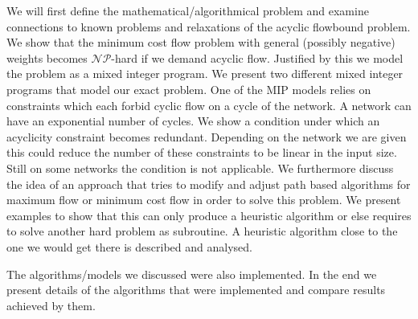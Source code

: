 We will first define the mathematical/algorithmical problem and examine connections to known problems 
and relaxations of the acyclic flowbound problem. We show that the minimum cost flow problem with general (possibly 
negative) weights becomes $\mathcal{NP}$-hard if we demand acyclic flow. 
Justified by this we model the problem as a mixed integer program. We present two different mixed integer programs 
that model our exact problem. One of the MIP models relies on constraints which each forbid cyclic flow on a cycle of 
the network. A network can have an exponential number of cycles. We show a condition under which an acyclicity 
constraint becomes redundant. Depending on the network we are given this could reduce the number of these constraints 
to be linear in the input size. Still on some networks the condition is not applicable.
We furthermore discuss the idea of an approach that tries to modify and adjust path based algorithms for maximum flow 
or minimum cost flow in order to solve this problem. We present examples to show that this can only produce a 
heuristic algorithm or else requires to solve another hard problem as subroutine. A heuristic algorithm close to the 
one we would get there is described and analysed.

The algorithms/models we discussed were also implemented. In the end we present details of the algorithms that were 
implemented and compare results achieved by them. 




